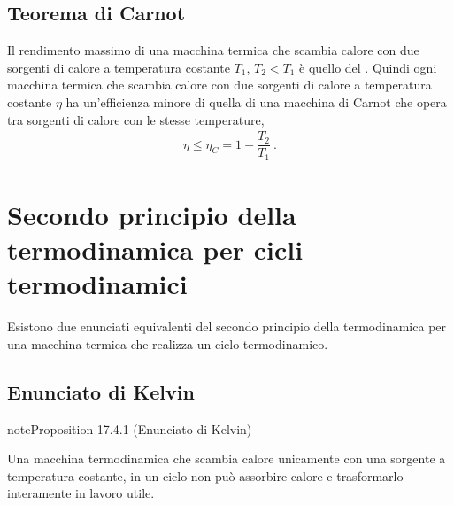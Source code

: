 \documentclass[letterpaper,10pt,italian]{jupyterBook}
\begin{document}
\subsection{Teorema di Carnot}
\label{\detokenize{ch/thermodynamics/heat-engine-carnot:teorema-di-carnot}}\label{\detokenize{ch/thermodynamics/heat-engine-carnot:physics-hs-thermodynamics-heat-engine-carnot-td-cycle-theorem}}
\sphinxAtStartPar
Il rendimento massimo di una macchina termica che scambia calore con due sorgenti di calore a temperatura costante \(T_1\), \(T_2 < T_1\) è quello del {\hyperref[\detokenize{ch/thermodynamics/heat-engine-carnot:physics-hs-thermodynamics-heat-engine-carnot-td-cycle}]{}}. Quindi ogni macchina termica che scambia calore con due sorgenti di calore a temperatura costante \(\eta\) ha un’efficienza minore di quella di una macchina di Carnot che opera tra sorgenti di calore con le stesse temperature,
\begin{equation*}
\begin{split}\eta \le \eta_C = 1 - \dfrac{T_2}{T_1} \ .\end{split}
\end{equation*}
\sphinxstepscope


\section{Secondo principio della termodinamica per cicli termodinamici}
\label{\detokenize{ch/thermodynamics/heat-engine-second-principle:secondo-principio-della-termodinamica-per-cicli-termodinamici}}\label{\detokenize{ch/thermodynamics/heat-engine-second-principle:physics-hs-thermodynamics-heat-engine-second-principle}}\label{\detokenize{ch/thermodynamics/heat-engine-second-principle::doc}}
\sphinxAtStartPar
Esistono due enunciati equivalenti del secondo principio della termodinamica per una macchina termica che realizza un ciclo termodinamico.


\subsection{Enunciato di Kelvin}
\label{\detokenize{ch/thermodynamics/heat-engine-second-principle:enunciato-di-kelvin}}\label{\detokenize{ch/thermodynamics/heat-engine-second-principle:physics-hs-thermodynamics-heat-engine-second-principle-kelvin}}\label{ch/thermodynamics/heat-engine-second-principle:proposition-0}
\begin{sphinxadmonition}{note}{Proposition 17.4.1 (Enunciato di Kelvin)}



\sphinxAtStartPar
Una macchina termodinamica che scambia calore unicamente con una sorgente a temperatura costante, in un ciclo non può assorbire calore e trasformarlo interamente in lavoro utile.
\end{sphinxadmonition}
\end{document}
